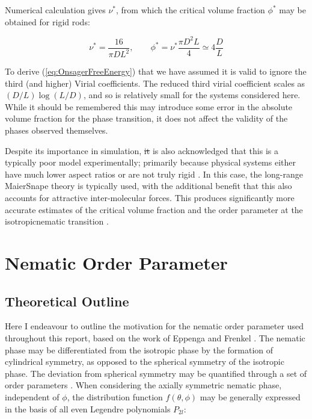 \documentclass[11pt, a4paper]{article} %
\providecommand{\DIFadd}[1]{{\protect\color{blue}\uwave{#1}}} %
\providecommand{\DIFdel}[1]{{\protect\color{red}\sout{#1}}}                      %
\providecommand{\DIFaddbegin}{} %
\providecommand{\DIFaddend}{} %
\providecommand{\DIFdelbegin}{} %
\providecommand{\DIFdelend}{} %
\begin{document}
\begin{appendices}
Numerical calculation gives $\nu^{*}$, from which the critical volume fraction $\phi^{*}$ may be obtained for rigid rods:

\begin{equation}
\nu^{*} = \frac{16}{\pi D L^{2}}, \qquad \phi^{*} = \nu^{*} \frac{\pi D^{2} L}{4} \simeq 4 \frac{D}{L}
\end{equation}


To derive (\ref{eq:OnsagerFreeEnergy}) that we have assumed it is valid to ignore the third (and higher) Virial coefficients. The reduced third virial coefficient scales as $(D/L)\log(L/D)$, and so is relatively small for the systems considered here. While it should be remembered this may introduce some error in the absolute volume fraction for the phase transition, it does not affect the validity of the phases observed themselves.

Despite its importance in simulation, \DIFdelbegin \DIFdel{it }\DIFdelend \DIFaddbegin \DIFadd{tt }\DIFaddend is also acknowledged that this is a typically poor model experimentally; primarily because physical systems either have much lower aspect ratios or are not truly rigid \cite{Odijk1985}. In this case, the long-range Maier\textendash Snape theory \cite{Maier1959} is typically used, with the additional benefit that this also accounts for attractive inter-molecular forces. This produces significantly more accurate estimates of the critical volume fraction and the order parameter at the isotropic\textendash nematic transition \cite{Zannoni1979b}.

\section{Nematic Order Parameter} 
\DIFdelbegin %
\DIFdelend \subsection{Theoretical Outline}\label{sec:OrderParamTheory}
Here I endeavour to outline the motivation for the nematic order parameter used throughout this report, based on the work of Eppenga and Frenkel \cite{Eppenga1984, Frenkel1982}. The nematic phase may be differentiated from the isotropic phase by the formation of cylindrical symmetry, as opposed to the spherical symmetry of the isotropic phase. The deviation from spherical symmetry may be quantified through a set of order parameters \cite{Zannoni1979}. When considering the axially symmetric nematic phase, independent of $\phi$, the distribution function $f(\theta, \phi)$ may be generally expressed in the basis of all even Legendre polynomials $P_{2l}$:


\end{appendices}
\end{document}

